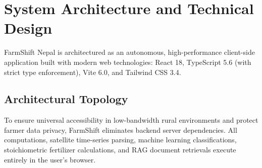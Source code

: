 \documentclass[11pt,a4paper]{report}
\begin{document}
\chapter{System Architecture and Technical Design}

FarmShift Nepal is architectured as an autonomous, high-performance client-side application built with modern web technologies: React 18, TypeScript 5.6 (with strict type enforcement), Vite 6.0, and Tailwind CSS 3.4.

\section{Architectural Topology}
To ensure universal accessibility in low-bandwidth rural environments and protect farmer data privacy, FarmShift eliminates backend server dependencies. All computations, satellite time-series parsing, machine learning classifications, stoichiometric fertilizer calculations, and RAG document retrievals execute entirely in the user's browser.
\end{document}
